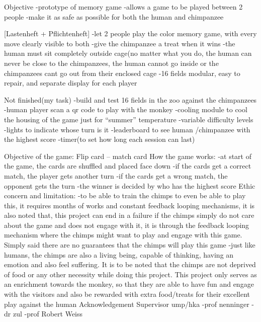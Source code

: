 Objective
-prototype of memory game
-allows a game to be played between 2 people
-make it as safe as possible for both the human and chimpanzee

[Lastenheft + Pflichtenheft]
-let 2 people play the color memory game, with every move clearly visible to both
-give the chimpanzee a treat when it wins
-the human must sit completely outside cage(no matter what you do, the human can never be close to the chimpanzees, the human cannot go inside or the chimpanzees cant go out from their enclosed cage
-16 fields modular, easy to repair, and separate display for each player

Not finished(my task)
-build and test 16 fields in the zoo against the chimpanzees
-human player scan a qr code to play with the monkey
-cooling module to cool the housing of the game just for “summer” temperature
-variable difficulty levels
-lights to indicate whose turn is it
-leaderboard to see human /chimpanzee with the highest score
-timer(to set how long each session can last)

Objective of the game:
Flip card – match card
How the game works:
-at start of the game, the cards are shuffled and placed face down
-if the cards get a correct match, the player gets another turn
-if the cards get a wrong match, the opponent gets the turn
-the winner is decided by who has the highest score
Ethic concern and limitation:
-to be able to train the chimps to even be able to play this, it requires months of works and constant feedback looping mechanisms, it is also noted that, this project can end in a failure if the chimps simply do not care about the game and does not engage with it, it is through the feedback looping mechanism where the chimps might want to play and engage with this game. Simply said there are no guarantees that the chimps will play this game
-just like humans, the chimps are also a living being, capable of thinking, having an emotion and also feel suffering. It is to be noted that the chimps are not deprived of food or any other necessity while doing this project. This project only serves as an enrichment towards the monkey, so that they are able to have fun and engage with the visitors and also be rewarded with extra food/treats for their excellent play against the human
 Acknowledgement
Supervisor ump/hka
-prof nenninger
-dr zul
-prof Robert Weiss

